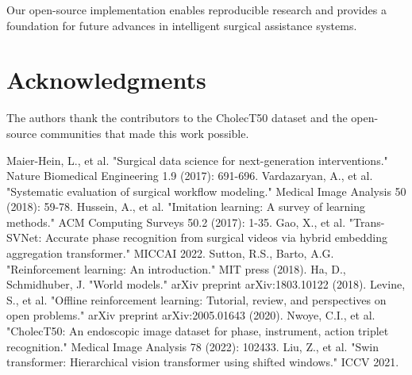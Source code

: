 \documentclass[conference]{IEEEtran}
\begin{document}
Our open-source implementation enables reproducible research and provides a foundation for future advances in intelligent surgical assistance systems.

\section*{Acknowledgments}

The authors thank the contributors to the CholecT50 dataset and the open-source communities that made this work possible.

\begin{thebibliography}{00}
 Maier-Hein, L., et al. "Surgical data science for next-generation interventions." Nature Biomedical Engineering 1.9 (2017): 691-696.
 Vardazaryan, A., et al. "Systematic evaluation of surgical workflow modeling." Medical Image Analysis 50 (2018): 59-78.
 Hussein, A., et al. "Imitation learning: A survey of learning methods." ACM Computing Surveys 50.2 (2017): 1-35.
 Gao, X., et al. "Trans-SVNet: Accurate phase recognition from surgical videos via hybrid embedding aggregation transformer." MICCAI 2022.
 Sutton, R.S., Barto, A.G. "Reinforcement learning: An introduction." MIT press (2018).
 Ha, D., Schmidhuber, J. "World models." arXiv preprint arXiv:1803.10122 (2018).
 Levine, S., et al. "Offline reinforcement learning: Tutorial, review, and perspectives on open problems." arXiv preprint arXiv:2005.01643 (2020).
 Nwoye, C.I., et al. "CholecT50: An endoscopic image dataset for phase, instrument, action triplet recognition." Medical Image Analysis 78 (2022): 102433.
 Liu, Z., et al. "Swin transformer: Hierarchical vision transformer using shifted windows." ICCV 2021.
\end{thebibliography}
\end{document}
